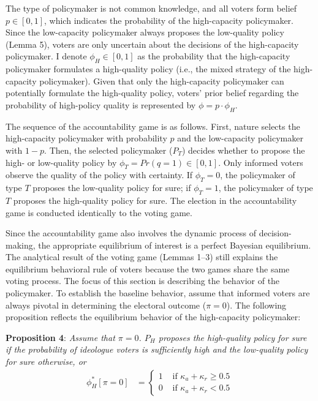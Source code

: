 \documentclass[doc,natbib,12pt]{apa6}
\begin{document}
	\par The type of policymaker is not common knowledge, and all voters form belief $p \in [0, 1]$, which indicates the probability of the high-capacity policymaker. Since the low-capacity policymaker always proposes the low-quality policy (Lemma 5), voters are only uncertain about the decisions of the high-capacity policymaker. I denote $\phi_H \in [0,1]$ as the probability that the high-capacity policymaker formulates a high-quality policy (i.e., the mixed strategy of the high-capacity policymaker). Given that only the high-capacity policymaker can potentially formulate the high-quality policy, voters' prior belief regarding the probability of high-policy quality is represented by $\phi = p \cdot \phi_H$.
	
	\par The sequence of the accountability game is as follows. First, nature selects the high-capacity policymaker with probability $p$ and the low-capacity policymaker with $1-p$. Then, the selected policymaker ($P_T$) decides whether to propose the high- or low-quality policy by $\phi_T = Pr(q=1) \in [0, 1]$. Only informed voters observe the quality of the policy with certainty. If $\phi_T = 0$, the policymaker of type $T$ proposes the low-quality policy for sure; if $\phi_T = 1$, the policymaker of type $T$ proposes the high-quality policy for sure. The election in the accountability game is conducted identically to the voting game. 
	
	\par Since the accountability game also involves the dynamic process of decision-making, the appropriate equilibrium of interest is a perfect Bayesian equilibrium. The analytical result of the voting game (Lemmas 1--3) still explains the equilibrium behavioral rule of voters because the two games share the same voting process. The focus of this section is describing the behavior of the policymaker. To establish the baseline behavior, assume that informed voters are always pivotal in determining the electoral outcome ($\pi=0$). The following proposition reflects the equilibrium behavior of the high-capacity policymaker:
	
	\noindent \textbf{Proposition 4}: \textit{Assume that $\pi=0$. $P_H$ proposes the high-quality policy for sure if the probability of ideologue voters is sufficiently high and the low-quality policy for sure otherwise, or}
	\begin{align}
	\phi^*_H[\pi=0] &=
	\begin{cases}
	1 &\text{ if }  \kappa_{a} + \kappa_{r} \geq 0.5 \\
	0 &\text{ if }  \kappa_{a} + \kappa_{r} < 0.5
	\end{cases}
	\end{align}
	
\end{document}
